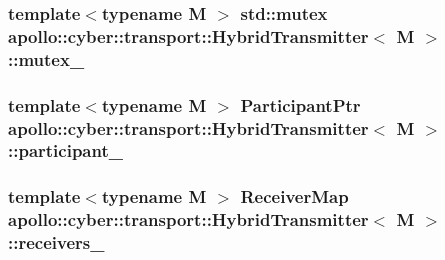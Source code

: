 \hypertarget{classapollo_1_1cyber_1_1transport_1_1HybridTransmitter_a176663880b7f2fad09dfca0bbadd00bf}{
\subsubsection[{mutex\-\_\-}]{\setlength{\rightskip}{0pt plus 5cm}template$<$typename M $>$ std\-::mutex {\bf apollo\-::cyber\-::transport\-::\-Hybrid\-Transmitter}$<$ M $>$\-::mutex\-\_\-\hspace{0.3cm}{\ttfamily [private]}}}\label{classapollo_1_1cyber_1_1transport_1_1HybridTransmitter_a176663880b7f2fad09dfca0bbadd00bf}
\hypertarget{classapollo_1_1cyber_1_1transport_1_1HybridTransmitter_a7edc04c43198a2ff400e7ef9d41c5e18}{
\subsubsection[{participant\-\_\-}]{\setlength{\rightskip}{0pt plus 5cm}template$<$typename M $>$ {\bf Participant\-Ptr} {\bf apollo\-::cyber\-::transport\-::\-Hybrid\-Transmitter}$<$ M $>$\-::participant\-\_\-\hspace{0.3cm}{\ttfamily [private]}}}\label{classapollo_1_1cyber_1_1transport_1_1HybridTransmitter_a7edc04c43198a2ff400e7ef9d41c5e18}
\hypertarget{classapollo_1_1cyber_1_1transport_1_1HybridTransmitter_aa6ef011a6f48194c1472ed77694df9e2}{
\subsubsection[{receivers\-\_\-}]{\setlength{\rightskip}{0pt plus 5cm}template$<$typename M $>$ {\bf Receiver\-Map} {\bf apollo\-::cyber\-::transport\-::\-Hybrid\-Transmitter}$<$ M $>$\-::receivers\-\_\-\hspace{0.3cm}{\ttfamily [private]}}}\label{classapollo_1_1cyber_1_1transport_1_1HybridTransmitter_aa6ef011a6f48194c1472ed77694df9e2}
